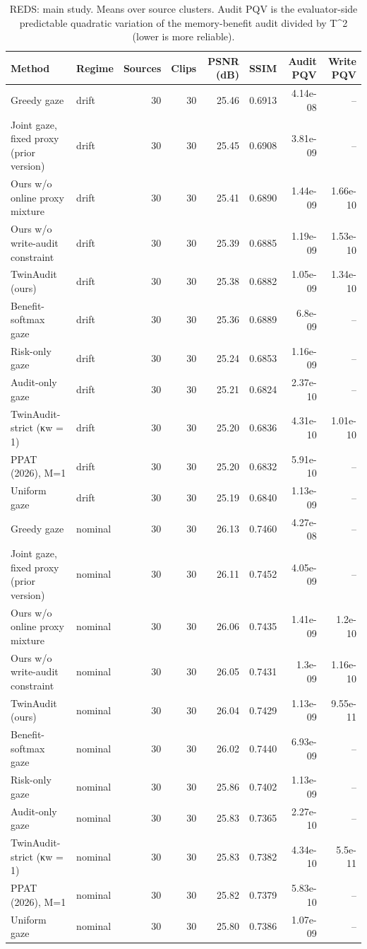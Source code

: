 \begin{table}[t]
\centering
\caption{REDS: main study. Means over source clusters. Audit PQV is the evaluator-side predictable quadratic variation of the memory-benefit audit divided by T^2 (lower is more reliable).}
\label{tab:main_REDS}
\small
\begin{tabular}{llrrrrrr}
\toprule
Method & Regime & Sources & Clips & PSNR (dB) & SSIM & Audit PQV & Write PQV \\
\midrule
Greedy gaze & drift & 30 & 30 & 25.46 & 0.6913 & 4.14e-08 & -- \\
Joint gaze, fixed proxy (prior version) & drift & 30 & 30 & 25.45 & 0.6908 & 3.81e-09 & -- \\
Ours w/o online proxy mixture & drift & 30 & 30 & 25.41 & 0.6890 & 1.44e-09 & 1.66e-10 \\
Ours w/o write-audit constraint & drift & 30 & 30 & 25.39 & 0.6885 & 1.19e-09 & 1.53e-10 \\
TwinAudit (ours) & drift & 30 & 30 & 25.38 & 0.6882 & 1.05e-09 & 1.34e-10 \\
Benefit-softmax gaze & drift & 30 & 30 & 25.36 & 0.6889 & 6.8e-09 & -- \\
Risk-only gaze & drift & 30 & 30 & 25.24 & 0.6853 & 1.16e-09 & -- \\
Audit-only gaze & drift & 30 & 30 & 25.21 & 0.6824 & 2.37e-10 & -- \\
TwinAudit-strict (κw = 1) & drift & 30 & 30 & 25.20 & 0.6836 & 4.31e-10 & 1.01e-10 \\
PPAT (2026), M=1 & drift & 30 & 30 & 25.20 & 0.6832 & 5.91e-10 & -- \\
Uniform gaze & drift & 30 & 30 & 25.19 & 0.6840 & 1.13e-09 & -- \\
Greedy gaze & nominal & 30 & 30 & 26.13 & 0.7460 & 4.27e-08 & -- \\
Joint gaze, fixed proxy (prior version) & nominal & 30 & 30 & 26.11 & 0.7452 & 4.05e-09 & -- \\
Ours w/o online proxy mixture & nominal & 30 & 30 & 26.06 & 0.7435 & 1.41e-09 & 1.2e-10 \\
Ours w/o write-audit constraint & nominal & 30 & 30 & 26.05 & 0.7431 & 1.3e-09 & 1.16e-10 \\
TwinAudit (ours) & nominal & 30 & 30 & 26.04 & 0.7429 & 1.13e-09 & 9.55e-11 \\
Benefit-softmax gaze & nominal & 30 & 30 & 26.02 & 0.7440 & 6.93e-09 & -- \\
Risk-only gaze & nominal & 30 & 30 & 25.86 & 0.7402 & 1.13e-09 & -- \\
Audit-only gaze & nominal & 30 & 30 & 25.83 & 0.7365 & 2.27e-10 & -- \\
TwinAudit-strict (κw = 1) & nominal & 30 & 30 & 25.83 & 0.7382 & 4.34e-10 & 5.5e-11 \\
PPAT (2026), M=1 & nominal & 30 & 30 & 25.82 & 0.7379 & 5.83e-10 & -- \\
Uniform gaze & nominal & 30 & 30 & 25.80 & 0.7386 & 1.07e-09 & -- \\
\bottomrule
\end{tabular}
\end{table}
